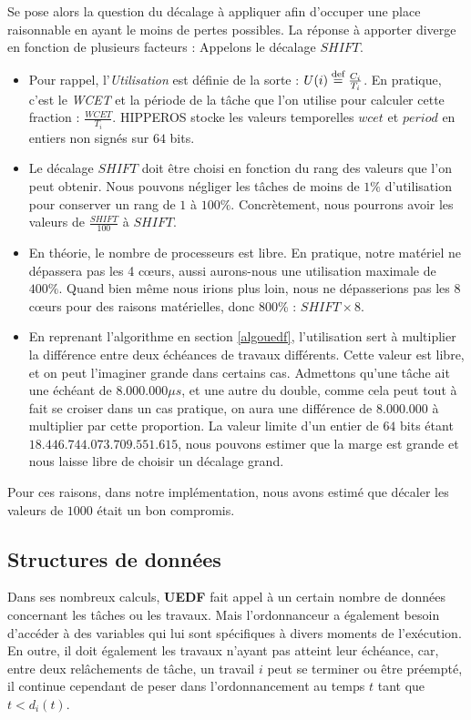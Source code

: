 		Se pose alors la question du décalage à appliquer afin d'occuper une place raisonnable en ayant 
		le moins de pertes possibles.  
		La réponse à apporter diverge en fonction de plusieurs facteurs :
		Appelons le décalage $SHIFT$.
		\begin{itemize}
			\setlength\itemsep{0.1em}
			\item Pour rappel, l'\textit{Utilisation} est définie de la sorte : $U(i) \stackrel{\text{def}}{=} \frac{C_i}{T_i}$. 
			En pratique, c'est le \textit{WCET} et la période de la tâche que l'on utilise pour calculer cette fraction : 
			$\frac{WCET}{T_i}$.
			HIPPEROS stocke les valeurs temporelles $wcet$ et $period$ en entiers non signés sur $64$ bits.
			
			\item Le décalage $SHIFT$ doit être choisi en fonction du rang des valeurs que l'on peut obtenir.
			Nous pouvons négliger les tâches de moins de $1 \%$ d'utilisation pour conserver un rang de $1$ à $100\%$.
			Concrètement, nous pourrons avoir les valeurs de $\frac{SHIFT}{100}$ à $SHIFT$.
			\item En théorie, le nombre de processeurs est libre. En pratique, 
			notre matériel ne dépassera pas les 4 cœurs, aussi aurons-nous une utilisation maximale de $400\%$.
			Quand bien même nous irions plus loin, nous ne dépasserions pas les 8 cœurs pour des raisons 
			matérielles, donc 800\% : $SHIFT \times 8$.
			\item En reprenant l'algorithme en section \ref{algouedf}, 
			l'utilisation sert à multiplier la différence entre deux échéances de travaux différents.
			Cette valeur est libre, et on peut l'imaginer grande dans certains cas. 
			Admettons qu'une tâche ait une échéant de $8.000.000 \mu s$, et une autre du double, comme cela 
			peut tout à fait se croiser dans un cas pratique, on aura une différence de $8.000.000$ à multiplier
			par cette proportion. 
			La valeur limite d'un entier de $64$ bits étant $18.446.744.073.709.551.615$, nous pouvons estimer que la marge 
			est grande et nous laisse libre de choisir un décalage grand.
		\end{itemize}
		Pour ces raisons, dans notre implémentation, nous avons estimé que décaler les valeurs de $1000$ était un bon compromis. 
		
	\subsection{Structures de données}
		Dans ses nombreux calculs, \textbf{UEDF} fait appel à un certain nombre de données concernant les tâches ou les travaux.
		Mais l'ordonnanceur a également besoin d'accéder à des variables qui lui sont 
		spécifiques à divers moments de l'exécution. 
		En outre, il doit également les travaux n'ayant pas atteint leur échéance, 
		car, entre deux relâchements de tâche, un travail $i$ peut se terminer ou être préempté, 
		il continue cependant de \og{}peser\fg{} dans l'ordonnancement au temps $t$ tant que $t < d_i(t)$.
		\newline
				
